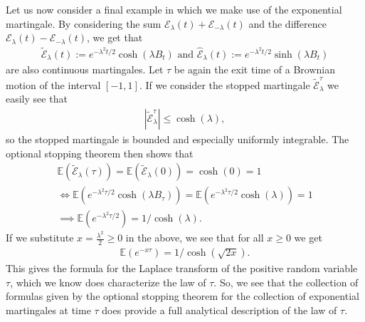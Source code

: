 \documentclass[../mainfile.tex]{subfiles}
\begin{document}
\begin{exmp} Let us now consider a final example in which we make use of the exponential martingale. By considering the sum $\mathcal{E}_\lambda (t) + \mathcal{E}_{- \lambda
}(t)$ and the difference $\mathcal{E}_\lambda(t) - \mathcal{E}_{- \lambda}(t)$, we get that
\begin{align*}
\tilde{\mathcal{E}}_\lambda (t) := e^{- \lambda^2t/2}\cosh( \lambda B_t) \text{ and } \hat{\mathcal{E}}_\lambda(t):= e^{- \lambda^2t/2} \sinh( \lambda B_t)
\end{align*}
are also continuous martingales.  Let $\tau$ be again the exit time of a Brownian motion of the interval $[-1,1]$. If we consider the stopped martingale $\tilde{\mathcal{E}}_\lambda^\tau$ we easily see that 
\begin{align*}
|\tilde{\mathcal{E}}_\lambda^\tau| \leq \cosh( \lambda), 
\end{align*}
so the stopped martingale is bounded and especially uniformly integrable. The optional stopping theorem then shows that 
\begin{align*}
\mathbb{E}( \tilde{\mathcal{E}}_\lambda( \tau)) = \mathbb{E}( \tilde{\mathcal{E}}_\lambda(0))= \cosh(0)=1 \\
\iff \mathbb{E}(e^{- \lambda^2 \tau/2} \cosh( \lambda B_\tau))= \mathbb{E}(e^{-\lambda^2 \tau/2} \cosh( \lambda)) =1 \\
\implies \mathbb{E}(e^{- \lambda^2 \tau/2}) = 1/ \cosh( \lambda). 
\end{align*}
If we substitute $x= \frac{\lambda^2}{2} \geq 0$ in the above, we see that for all $x \geq 0$ we get 
\begin{align*}
\mathbb{E}(e^{- x \tau}) = 1/ \cosh( \sqrt{2x}).
\end{align*}
This gives the formula for the Laplace transform of the positive random variable $\tau$, which we know does characterize the law of $\tau$. So, we see that the collection of formulas given by the optional stopping theorem for the collection of exponential martingales at time $\tau$ does provide a full analytical description of the law of $\tau$. 
\end{exmp}
\end{document}
